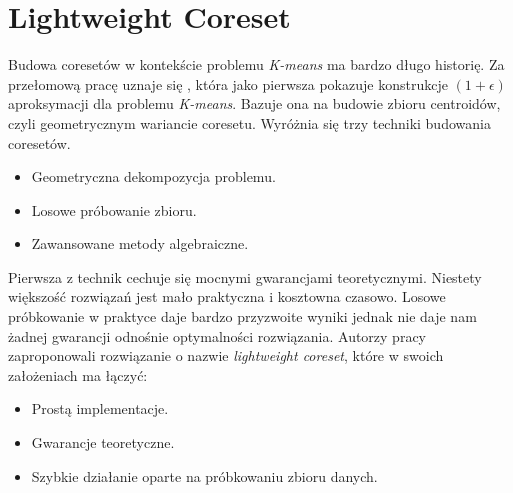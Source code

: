 \chapter{Lightweight Coreset}

Budowa coresetów w kontekście problemu \textit{K-means} ma bardzo długo historię.
Za przełomową pracę uznaje się \cite{Matousek99onapproximate}, która jako pierwsza pokazuje konstrukcje $(1+\epsilon)$ aproksymacji dla problemu \textit{K-means}.
Bazuje ona na budowie zbioru centroidów, czyli geometrycznym wariancie coresetu.
Wyróżnia się trzy techniki budowania coresetów.
\begin{itemize}
    \item Geometryczna dekompozycja problemu.
    \item Losowe próbowanie zbioru.
    \item Zawansowane metody algebraiczne.
\end{itemize}
Pierwsza z technik cechuje się mocnymi gwarancjami teoretycznymi.
Niestety większość rozwiązań jest mało praktyczna i kosztowna czasowo.
Losowe próbkowanie w praktyce daje bardzo przyzwoite wyniki jednak nie daje nam żadnej gwarancji odnośnie optymalności rozwiązania.
Autorzy pracy \cite{bachem2017scalable} zaproponowali rozwiązanie o nazwie \textit{lightweight coreset}, które w swoich założeniach ma łączyć:
\begin{itemize}
    \item Prostą implementacje.
    \item Gwarancje teoretyczne.
    \item Szybkie działanie oparte na próbkowaniu zbioru danych.
\end{itemize}


